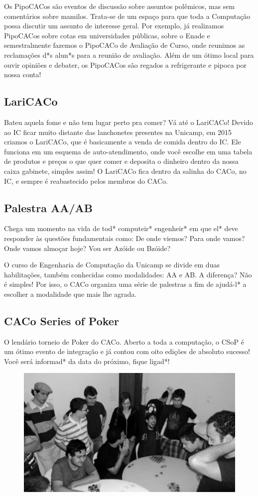 Os PipoCACos são eventos de discussão sobre assuntos polêmicos, mas sem
comentários sobre mamilos. Trata-se de um espaço para que toda a Computação
possa discutir um assunto de interesse geral. Por exemplo, já realizamos
PipoCACos sobre cotas em universidades públicas, sobre o Enade e semestralmente
fazemos o PipoCACo de Avaliação de Curso, onde reunimos as reclamações d*s
alun*s para a reunião de avaliação. Além de um ótimo local para ouvir opiniões e
debater, os PipoCACos são regados a refrigerante e pipoca por nossa conta!

\subsection{LariCACo}

Bateu aquela fome e não tem lugar perto pra comer? Vá até o LariCACo!  Devido ao
IC ficar muito distante das lanchonetes presentes na Unicamp, em 2015 criamos o
LariCACo, que é basicamente a venda de comida dentro do IC. Ele funciona em um
esquema de auto-atendimento, onde você escolhe em uma tabela de produtos e
preços o que quer comer e deposita o dinheiro dentro da nossa caixa gabinete,
simples assim! O LariCACo fica dentro da salinha do CACo, no IC, e sempre é
reabastecido pelos membros do CACo.

\subsection{Palestra AA/AB}

Chega um momento na vida de tod* computeir* engenheir* em que el* deve responder
às questões fundamentais como: De onde viemos? Para onde vamos? Onde vamos
almoçar hoje? Vou ser Azóide ou Bzóide?

O curso de Engenharia de Computação da Unicamp se divide em duas habilitações,
também conhecidas como modalidades: AA e AB. A diferença? Não é simples! Por
isso, o CACo organiza uma série de palestras a fim de ajudá-l* a escolher a
modalidade que mais lhe agrada.

\subsection{CACo Series of Poker}

O lendário torneio de Poker do CACo. Aberto a toda a computação, o CSoP é um
ótimo evento de integração e já contou com oito edições de absoluto sucesso!
Você será informad* da data do próximo, fique ligad*!

\begin{figure}[H]
    \centering
    \includegraphics[width=.45\textwidth]{img/alem_da_graduacao/caco_poker2.jpg}
\end{figure}


